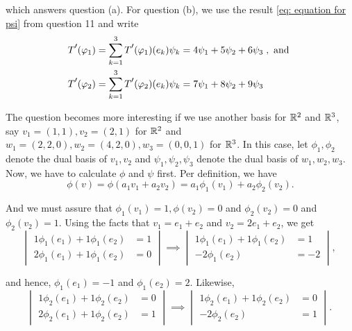 \begin{xrcs}
\begin{xsol}
    which answers question (a). For question (b), we use the result \eqref{eq: equation for psi} from question 11 and write
    \begin{equation}
      \begin{aligned}
        &\dual{T} (\varphi_1) =  \sum_{k=1}^{3} \dual{T} (\varphi_1) (e_k) \psi_k = 4 \psi_1 + 5 \psi_2 + 6 \psi_3 \; , \text{ and }  \\
        &\dual{T} (\varphi_2) =  \sum_{k=1}^{3} \dual{T} (\varphi_2) (e_k) \psi_k = 7 \psi_1 + 8 \psi_2 + 9 \psi_3 \;
      \end{aligned}
    \end{equation}


     The question becomes more interesting if we use another basis for $\mathbb{R}^2$ and $\mathbb{R}^3$, say $v_1 = (1,1), v_2=(2,1)$ for $\mathbb{R}^2$ and $w_1 = (2,2,0), w_2 = (4,2,0), w_3 = (0,0,1)$ for $\mathbb{R}^3$. In this case, let $\phi_1, \phi_2$ denote the dual basis of $v_1, v_2$ and $\psi_1, \psi_2, \psi_3$ denote the dual basis of $w_1, w_2, w_3$. Now, we have to calculate $\phi$ and $\psi$ first. Per definition, we have
    \begin{equation}
      \phi(v) = \phi (a_1 v_1 + a_2 v_2) = a_1 \phi_1 (v_1) + a_2 \phi_2 (v_2).
    \end{equation}

    And we must assure that $\phi_1(v_1)=1, \phi(v_2)=0$ and $\phi_2(v_2)=0$ and $\phi_2(v_2) = 1$. Using the facts that $v_1 = e_1 + e_2$ and $v_2 = 2 e_1 + e_2$, we get
    \begin{equation}
      \left | \;
      \begin{aligned}
        1 \phi_1 (e_1) + 1 \phi_1 (e_2) &= 1 \\
        2 \phi_1 (e_1) + 1 \phi_1 (e_2) &= 0
      \end{aligned} \;
      \right  | \; \implies \;
      \left | \;
        \begin{aligned}
          1 \phi_1 (e_1) + 1 \phi_1 (e_2) &= 1 \\
                         - 2 \phi_1 (e_2) &= -2
        \end{aligned} \;
      \right | \; ,
    \end{equation}

    and hence, $\phi_1(e_1) = -1$ and $\phi_1(e_2) = 2$. Likewise,
    \begin{equation}
    \left | \;
    \begin{aligned}
      1 \phi_2 (e_1) + 1 \phi_2(e_2) &= 0 \\
      2 \phi_2 (e_1) + 1 \phi_2 (e_2) &= 1
    \end{aligned} \;
    \right  | \; \implies \;
    \left | \;
    \begin{aligned}
      1 \phi_2 (e_1) + 1 \phi_2 (e_2) &= 0 \\
      - 2 \phi_2 (e_2) &= 1
    \end{aligned} \;
    \right | \; .
    \end{equation}


\end{xsol}
\end{xrcs}
